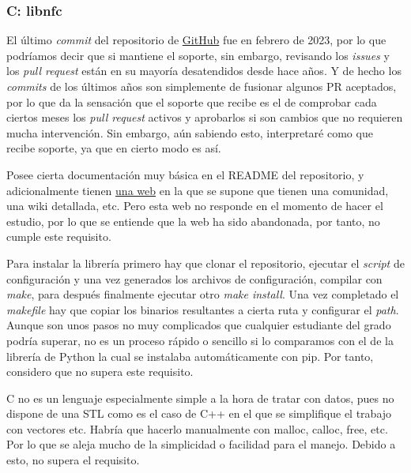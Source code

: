 \subsubsection{C: libnfc}

\begin{todolist}
    \item [\xcmark] El último \emph{commit} del repositorio de
    \href{https://github.com/nfc-tools/libnfc}{GitHub} fue en febrero de 2023,
    por lo que podríamos decir que si mantiene el soporte, sin embargo,
    revisando los \emph{issues} y los \emph{pull request} están en su mayoría
    desatendidos desde hace años. Y de hecho los \emph{commits} de los últimos años son
    simplemente de fusionar algunos PR aceptados, por lo que da la sensación que
    el soporte que recibe es el de comprobar cada ciertos meses los \emph{pull
    request} activos y aprobarlos si son cambios que no requieren mucha
    intervención. Sin embargo, aún sabiendo esto, interpretaré como que recibe
    soporte, ya que en cierto modo es así.
    \item Posee cierta documentación muy básica en el README del repositorio, y
    adicionalmente tienen \href{nfc-tools.org}{una web} en la que se supone que
    tienen una comunidad, una wiki detallada, etc. Pero esta web no responde en
    el momento de hacer el estudio, por lo que se entiende que la web ha sido
    abandonada, por tanto, no cumple este requisito.
    \item Para instalar la librería primero hay que clonar el repositorio,
    ejecutar el \emph{script} de configuración y una vez generados los archivos
    de configuración, compilar con \emph{make}, para después finalmente ejecutar otro
    \emph{make install}. Una vez completado el \emph{makefile} hay que copiar los binarios
    resultantes a cierta ruta y configurar el \emph{path}. Aunque son unos pasos
    no muy complicados que cualquier estudiante del grado podría superar, no es
    un proceso rápido o sencillo si lo comparamos con el de la librería de
    Python la cual se instalaba automáticamente con pip. Por tanto, considero que
    no supera este requisito.
    \item C no es un lenguaje especialmente simple a la hora de tratar con
    datos, pues no dispone de una STL como es el caso de C++ en el que se
    simplifique el trabajo con vectores etc. Habría que hacerlo manualmente con
    malloc, calloc, free, etc. Por lo que se aleja mucho de la simplicidad o
    facilidad para el manejo. Debido a esto, no supera el requisito.
\end{todolist}


